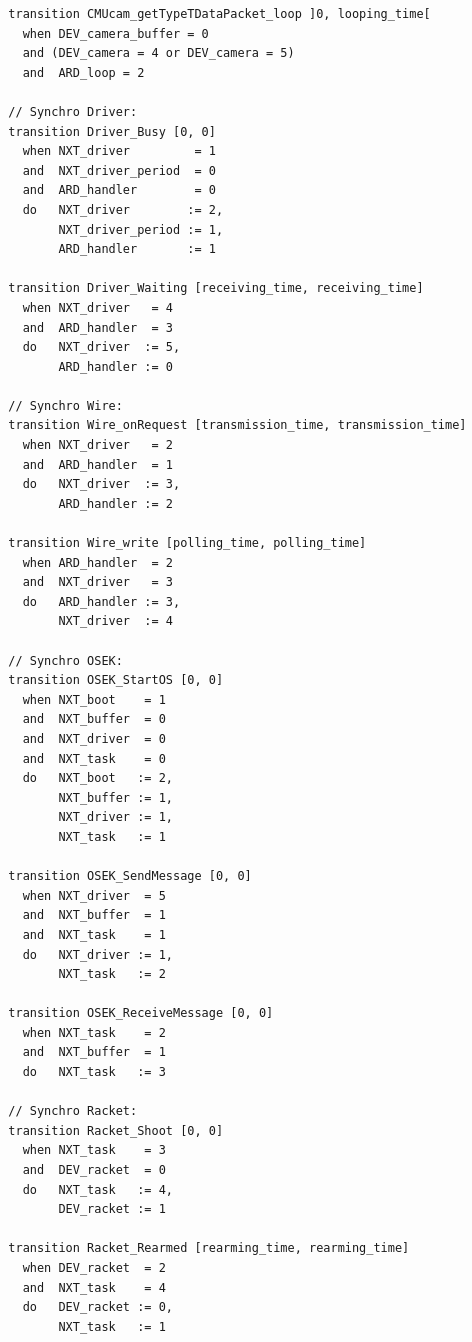\begin{lstlisting}
  transition CMUcam_getTypeTDataPacket_loop ]0, looping_time[
    when DEV_camera_buffer = 0
    and (DEV_camera = 4 or DEV_camera = 5)
    and  ARD_loop = 2

  // Synchro Driver:
  transition Driver_Busy [0, 0]
    when NXT_driver         = 1
    and  NXT_driver_period  = 0
    and  ARD_handler        = 0
    do   NXT_driver        := 2,
         NXT_driver_period := 1,
         ARD_handler       := 1

  transition Driver_Waiting [receiving_time, receiving_time]
    when NXT_driver   = 4
    and  ARD_handler  = 3
    do   NXT_driver  := 5,
         ARD_handler := 0

  // Synchro Wire:
  transition Wire_onRequest [transmission_time, transmission_time]
    when NXT_driver   = 2
    and  ARD_handler  = 1
    do   NXT_driver  := 3,
         ARD_handler := 2

  transition Wire_write [polling_time, polling_time]
    when ARD_handler  = 2
    and  NXT_driver   = 3
    do   ARD_handler := 3,
         NXT_driver  := 4

  // Synchro OSEK:
  transition OSEK_StartOS [0, 0]
    when NXT_boot    = 1
    and  NXT_buffer  = 0
    and  NXT_driver  = 0
    and  NXT_task    = 0
    do   NXT_boot   := 2,
         NXT_buffer := 1,
         NXT_driver := 1,
         NXT_task   := 1

  transition OSEK_SendMessage [0, 0]
    when NXT_driver  = 5
    and  NXT_buffer  = 1
    and  NXT_task    = 1
    do   NXT_driver := 1,
         NXT_task   := 2

  transition OSEK_ReceiveMessage [0, 0]
    when NXT_task    = 2
    and  NXT_buffer  = 1
    do   NXT_task   := 3

  // Synchro Racket:
  transition Racket_Shoot [0, 0]
    when NXT_task    = 3
    and  DEV_racket  = 0
    do   NXT_task   := 4,
         DEV_racket := 1

  transition Racket_Rearmed [rearming_time, rearming_time]
    when DEV_racket  = 2
    and  NXT_task    = 4
    do   DEV_racket := 0,
         NXT_task   := 1
\end{lstlisting}

